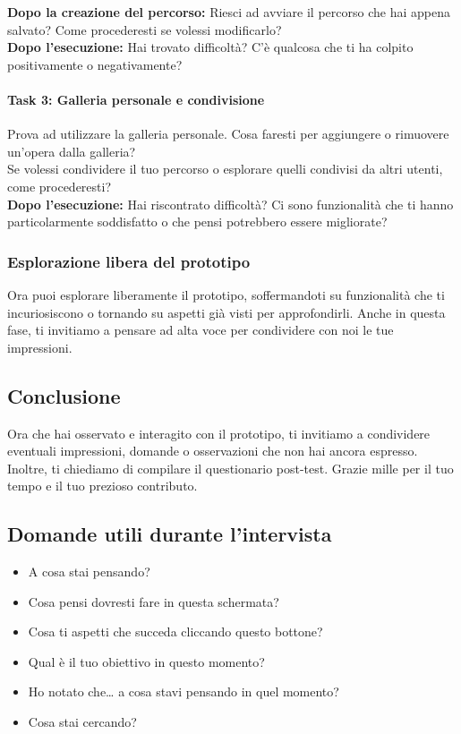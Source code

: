 \documentclass{article}
\begin{document}
\textbf{Dopo la creazione del percorso:} 
Riesci ad avviare il percorso che hai appena salvato? Come procederesti se volessi modificarlo?\\

\textbf{Dopo l'esecuzione:} 
Hai trovato difficoltà? C’è qualcosa che ti ha colpito positivamente o negativamente?

\paragraph*{Task 3: Galleria personale e condivisione}
Prova ad utilizzare la galleria personale. Cosa faresti per aggiungere o rimuovere un’opera dalla galleria?\\

Se volessi condividere il tuo percorso o esplorare quelli condivisi da altri utenti, come procederesti?\\

\textbf{Dopo l'esecuzione:} 
Hai riscontrato difficoltà? Ci sono funzionalità che ti hanno particolarmente soddisfatto o che pensi potrebbero essere migliorate?

\subsubsection{Esplorazione libera del prototipo}
Ora puoi esplorare liberamente il prototipo, soffermandoti su funzionalità che ti incuriosiscono o tornando su aspetti già visti per approfondirli. Anche in questa fase, ti invitiamo a pensare ad alta voce per condividere con noi le tue impressioni.

\subsection{Conclusione}
Ora che hai osservato e interagito con il prototipo, ti invitiamo a condividere eventuali impressioni, domande o osservazioni che non hai ancora espresso. Inoltre, ti chiediamo di compilare il questionario post-test. Grazie mille per il tuo tempo e il tuo prezioso contributo. 

\subsection{Domande utili durante l’intervista}
\begin{itemize}
    \item A cosa stai pensando?
    \item Cosa pensi dovresti fare in questa schermata?
    \item Cosa ti aspetti che succeda cliccando questo bottone?
    \item Qual \`e il tuo obiettivo in questo momento?
    \item Ho notato che… a cosa stavi pensando in quel momento?
    \item Cosa stai cercando?
\end{itemize}
\end{document}
